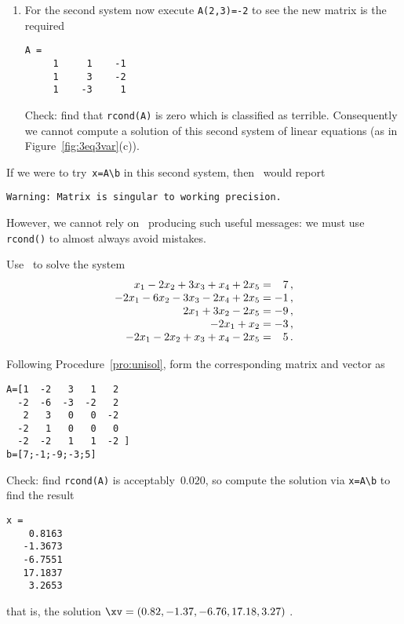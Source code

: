 \begin{example}
\begin{solution}
\begin{enumerate}
\item For the second system now execute \verb|A(2,3)=-2| to see the new matrix is the required
\begin{verbatim}
A =
     1     1    -1
     1     3    -2
     1    -3     1
\end{verbatim}
Check: find that \verb|rcond(A)| is zero which is classified as terrible.
Consequently we cannot compute a solution of this second system of linear equations (as in Figure~\ref{fig:3eq3var}(c)).
\end{enumerate}
If we were to try~\verb|x=A\b| in this second system, then \script\ would report
\begin{verbatim}
Warning: Matrix is singular to working precision. 
\end{verbatim}
However, we cannot rely on \script\ producing such useful messages: we must use \verb|rcond()| to almost always avoid mistakes.
\end{solution}
\end{example}



\begin{example} \label{eg:5eqns5vars}
Use \script\ to solve the system
\begin{equation*}
\begin{array}{r@{{}={}}r}
x_1-2x_2+3x_3+x_4+2x_5&7\,,\\
-2x_1-6x_2-3x_3-2x_4+2x_5&-1\,,\\
2x_1+3x_2-2x_5&-9\,,\\
-2x_1+x_2&-3\,,\\
-2x_1-2x_2+x_3+x_4-2x_5&5\,.
\end{array}
\end{equation*}

\begin{solution} 
Following Procedure~\ref{pro:unisol}, form the corresponding matrix and vector as
\begin{verbatim}
A=[1  -2   3   1   2
  -2  -6  -3  -2   2
   2   3   0   0  -2
  -2   1   0   0   0
  -2  -2   1   1  -2 ]
b=[7;-1;-9;-3;5]
\end{verbatim}
Check: find \verb|rcond(A)| is acceptably~\(0.020\), so compute the solution via \verb|x=A\b| to find the result
\setbox\ajrqrbox\hbox{}%
\marginpar{\usebox{\ajrqrbox\\[2ex]}}%
\begin{verbatim}
x =
    0.8163
   -1.3673
   -6.7551
   17.1837
    3.2653
\end{verbatim}
that is, the solution \(\xv=(0.82,-1.37,-6.76,17.18,3.27)\) \twodp.
\end{solution}
\end{example}


